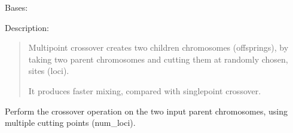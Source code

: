 \documentclass[letterpaper,10pt,english]{sphinxmanual}
\begin{document}
\begin{fulllineitems}
\label{\detokenize{pygenalgo.operators.crossover:pygenalgo.operators.crossover.mutli_point_crossover.MultiPointCrossover}}
\pysigstartsignatures
{}
\pysigstopsignatures
\sphinxAtStartPar
Bases: {\hyperref[\detokenize{pygenalgo.operators.crossover:pygenalgo.operators.crossover.crossover_operator.CrossoverOperator}]{}}

\sphinxAtStartPar
Description:
\begin{quote}

\sphinxAtStartPar
Multipoint crossover creates two children chromosomes (offsprings),
by taking two parent chromosomes and cutting them at randomly chosen,
sites (loci).

\sphinxAtStartPar
It produces faster mixing, compared with single\sphinxhyphen{}point crossover.
\end{quote}

\begin{fulllineitems}
\label{\detokenize{pygenalgo.operators.crossover:pygenalgo.operators.crossover.mutli_point_crossover.MultiPointCrossover.crossover}}
\pysigstartsignatures
{}
\pysigstopsignatures
\sphinxAtStartPar
Perform the crossover operation on the two input parent
chromosomes, using multiple cutting points (num\_loci).


\end{fulllineitems}
\end{fulllineitems}
\end{document}
